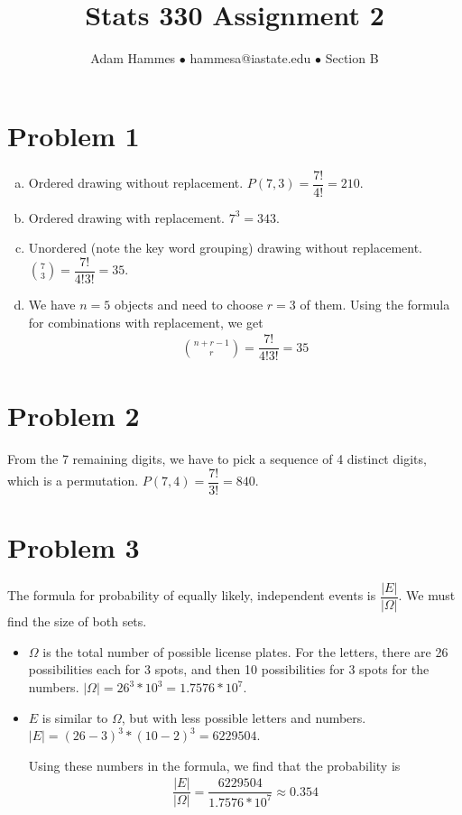 \documentclass[11pt]{article}
\begin{document}
\title{Stats 330 Assignment 2}
\author{Adam Hammes $\bullet$ hammesa@iastate.edu $\bullet$ Section B}
\maketitle

\section*{Problem 1}
	\begin{enumerate}[(a)]
		\item Ordered drawing without replacement. $P( 7, 3) = \dfrac{7!}{4!} = 
		210$.
		
		\item Ordered drawing with replacement. $7^3 = 343$.
		
		\item Unordered (note the key word grouping) drawing without replacement. $\binom{7}{3} = \dfrac{7!}{4!3!} = 35$.
		
		\item We have $n= 5$ objects and need to choose $r=3$ of them. Using the formula for combinations with replacement, we get
		\begin{align*}
		\binom{n+r-1}{r} =\dfrac{7!}{4!3!} = 35 
		\end{align*}
		
	
	\end{enumerate}
	
\section*{Problem 2}

From the 7 remaining digits, we have to pick a sequence of 4 distinct digits, which is a permutation. $P(7, 4) = \dfrac{7!}{3!} = 840$.

\section*{Problem 3}

The formula for probability of equally likely, independent events is $\dfrac{|E|}{|\Omega|}$. We must find the size of both sets.
\begin{itemize}
	\item $\Omega$ is the total number of possible license plates. For the letters, 
	there are 26 possibilities each for 3 spots, and then 10 possibilities for 3 spots 
	for the numbers. $|\Omega| = 26^3 * 10^ 3 = 1.7576 * 10^7$.
	
	\item $E$ is similar to $\Omega$, but with less possible letters and numbers. $|E| = (26-3)^3 * (10-2)^3 = 6229504$.
	
Using these numbers in the formula, we find that the probability is
\begin{align*}
\dfrac{|E|}{|\Omega|} = \dfrac{6229504}{1.7576 * 10^7} \approx 0 .354
\end{align*}
\end{itemize}


 
\end{document}
